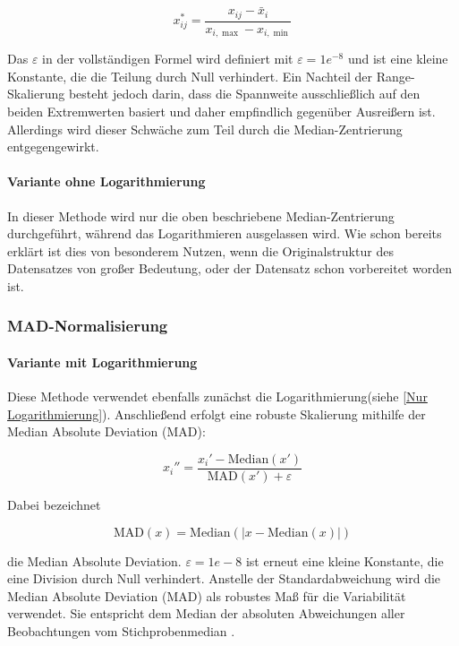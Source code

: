 \documentclass[12pt]{article}
\begin{document}
\[
x_{ij}^{*}=\frac{x_{ij}-\bar{x}_{i}}{x_{i,\max}-x_{i,\min}}
\] 

Das $\varepsilon$ in der vollständigen Formel wird definiert mit $\varepsilon = 1e^{-8}$ und ist eine kleine Konstante, die die Teilung durch Null verhindert.
Ein Nachteil der Range-Skalierung besteht jedoch darin, dass die Spannweite ausschließlich auf den beiden Extremwerten basiert und daher empfindlich gegenüber Ausreißern ist\cite{medianCentering}. Allerdings wird dieser Schwäche zum Teil durch die Median-Zentrierung entgegengewirkt. 

\paragraph{Variante ohne Logarithmierung}

In dieser Methode wird nur die oben beschriebene Median-Zentrierung durchgeführt, während das Logarithmieren ausgelassen wird. Wie schon bereits erklärt ist dies von besonderem Nutzen, wenn die Originalstruktur des Datensatzes von großer Bedeutung, oder der Datensatz schon vorbereitet worden ist.


\subsubsection{MAD-Normalisierung}
\label{MAD-Normalisierung}

\paragraph{Variante mit Logarithmierung}

Diese Methode verwendet ebenfalls zunächst die Logarithmierung(siehe \ref{Nur Logarithmierung}). Anschließend erfolgt eine robuste Skalierung mithilfe der Median Absolute Deviation (MAD):

\[
x_i''=\frac{x_i'-\mathrm{Median}(x')}{\mathrm{MAD}(x')+\varepsilon}
\]

Dabei bezeichnet

\[
\mathrm{MAD}(x)=\mathrm{Median}\left(\left|x-\mathrm{Median}(x)\right|\right)
\]

die Median Absolute Deviation. $\varepsilon= 1e-8$ ist erneut eine kleine Konstante, die eine Division durch Null verhindert.
Anstelle der Standardabweichung wird die Median Absolute Deviation (MAD) als robustes Maß für die Variabilität verwendet. Sie entspricht dem Median der absoluten Abweichungen aller Beobachtungen vom Stichprobenmedian \cite{MADSchmidt}.
\end{document}
